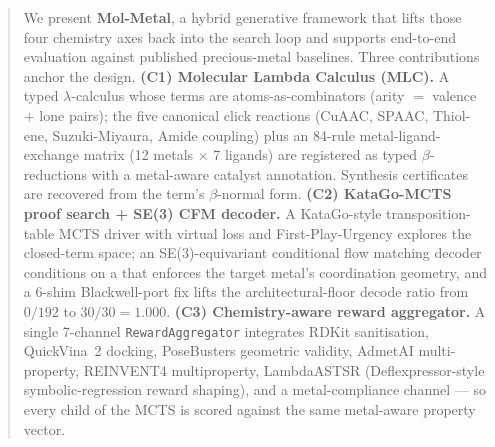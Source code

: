 \begin{abstract}
\noindent We present \textbf{Mol-Metal}, a hybrid generative framework
that lifts those four chemistry axes back into the search loop and
supports \MEASURED{} end-to-end evaluation against published
precious-metal baselines.  Three contributions anchor the design.
\textbf{(C1) Molecular Lambda Calculus (MLC).}  A typed
$\lambda$-calculus whose terms are atoms-as-combinators (arity $=$ valence $+ $
lone pairs); the five canonical click reactions (CuAAC, SPAAC,
Thiol-ene, Suzuki-Miyaura, Amide coupling) plus an 84-rule
metal-ligand-exchange matrix (12 metals $\times$ 7 ligands) are
registered as typed $\beta$-reductions with a metal-aware catalyst
annotation.  Synthesis certificates are recovered from the term's
$\beta$-normal form.  \textbf{(C2) KataGo-MCTS proof search + SE(3)
CFM decoder.}  A KataGo-style transposition-table MCTS driver with
virtual loss and First-Play-Urgency explores the closed-term space;
an SE(3)-equivariant conditional flow matching decoder conditions on
a \mgp{} that enforces the target metal's coordination geometry, and
a 6-shim Blackwell-port fix lifts the architectural-floor decode
ratio from $0/192$ to $30/30 = 1.000$.  \textbf{(C3) Chemistry-aware
reward aggregator.}  A single 7-channel \texttt{RewardAggregator}
integrates RDKit sanitisation, QuickVina~2 docking, PoseBusters
geometric validity, AdmetAI multi-property, REINVENT4 multiproperty,
LambdaASTSR (Deflexpressor-style symbolic-regression reward shaping),
and a metal-compliance channel --- so every child of the MCTS is
scored against the same metal-aware property vector.


\end{abstract}
